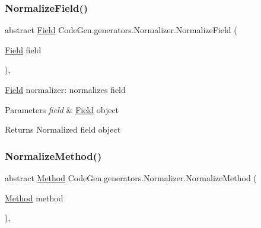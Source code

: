 \subsubsection{\texorpdfstring{Normalize\+Field()}{NormalizeField()}}
{\footnotesize\ttfamily abstract \mbox{\hyperlink{classCodeGen_1_1generators_1_1Field}{Field}} Code\+Gen.\+generators.\+Normalizer.\+Normalize\+Field (\begin{DoxyParamCaption}\item[{\mbox{\hyperlink{classCodeGen_1_1generators_1_1Field}{Field}}}]{field }\end{DoxyParamCaption})\hspace{0.3cm}{\ttfamily [protected]}, {}}



\mbox{\hyperlink{classCodeGen_1_1generators_1_1Field}{Field}} normalizer\+: normalizes field 


\begin{DoxyParams}{Parameters}
{\em field} & \mbox{\hyperlink{classCodeGen_1_1generators_1_1Field}{Field}} object\\
\hline
\end{DoxyParams}
\begin{DoxyReturn}{Returns}
Normalized field object
\end{DoxyReturn}
\mbox{\label{classCodeGen_1_1generators_1_1Normalizer_a68a4b1c8b53e9ce28507430412cb310e}} 
\subsubsection{\texorpdfstring{Normalize\+Method()}{NormalizeMethod()}}
{\footnotesize\ttfamily abstract \mbox{\hyperlink{classCodeGen_1_1generators_1_1Method}{Method}} Code\+Gen.\+generators.\+Normalizer.\+Normalize\+Method (\begin{DoxyParamCaption}\item[{\mbox{\hyperlink{classCodeGen_1_1generators_1_1Method}{Method}}}]{method }\end{DoxyParamCaption})\hspace{0.3cm}{\ttfamily [protected]}, {}}



